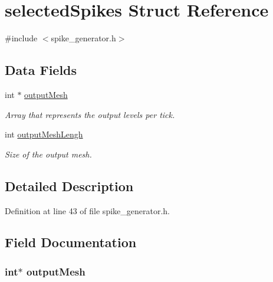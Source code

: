 \hypertarget{structselected_spikes}{}\section{selected\+Spikes Struct Reference}
\label{structselected_spikes}


{\ttfamily \#include $<$spike\+\_\+generator.\+h$>$}

\subsection*{Data Fields}
\begin{DoxyCompactItemize}
\item 
int $\ast$ \hyperlink{structselected_spikes_a666eb9ad96121cf3e4ce134e1a4c12c0}{output\+Mesh}
\begin{DoxyCompactList}\small\item\em Array that represents the output levels per tick. \end{DoxyCompactList}\item 
int \hyperlink{structselected_spikes_a97727a3be0dbd5813f860c99733048a8}{output\+Mesh\+Lengh}
\begin{DoxyCompactList}\small\item\em Size of the output mesh. \end{DoxyCompactList}\end{DoxyCompactItemize}


\subsection{Detailed Description}


Definition at line 43 of file spike\+\_\+generator.\+h.



\subsection{Field Documentation}
\hypertarget{structselected_spikes_a666eb9ad96121cf3e4ce134e1a4c12c0}{}
\subsubsection[{output\+Mesh}]{\setlength{\rightskip}{0pt plus 5cm}int$\ast$ output\+Mesh}\label{structselected_spikes_a666eb9ad96121cf3e4ce134e1a4c12c0}


